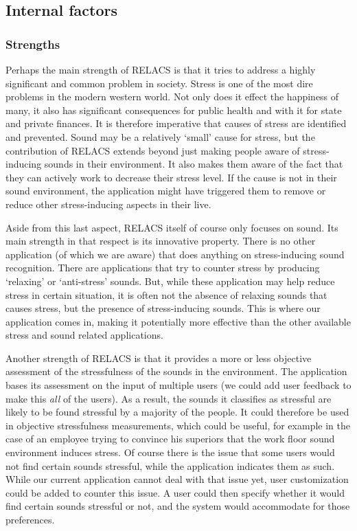 \documentclass[a4paper]{article}
\begin{document}
\subsection{Internal factors}
\subsubsection{Strengths}
Perhaps the main strength of RELACS is that it tries to address a highly significant and common problem in society.
Stress is one of the most dire problems in the modern western world.
Not only does it effect the happiness of many, it also has significant consequences for public health and with it for state and private finances.
It is therefore imperative that causes of stress are identified and prevented.
Sound may be a relatively `small' cause for stress, but the contribution of RELACS extends beyond just making people aware of stress-inducing sounds in their environment.
It also makes them aware of the fact that they can actively work to decrease their stress level.
If the cause is not in their sound environment, the application might have triggered them to remove or reduce other stress-inducing aspects in their live.

Aside from this last aspect, RELACS itself of course only focuses on sound.
Its main strength in that respect is its innovative property.
There is no other application (of which we are aware) that does anything on stress-inducing sound recognition.
There are applications that try to counter stress by producing `relaxing' or `anti-stress' sounds.
But, while these application may help reduce stress in certain situation, it is often not the absence of relaxing sounds that causes stress, but the presence of stress-inducing sounds.
This is where our application comes in, making it potentially more effective than the other available stress and sound related applications.

Another strength of RELACS is that it provides a more or less objective assessment of the stressfulness of the sounds in the environment.
The application bases its assessment on the input of multiple users (we could add user feedback to make this \textit{all} of the users).
As a result, the sounds it classifies as stressful are likely to be found stressful by a majority of the people.
It could therefore be used in objective stressfulness measurements, which could be useful,
for example in the case of an employee trying to convince his superiors that the work floor sound environment induces stress.
Of course there is the issue that some users would not find certain sounds stressful, while the application indicates them as such.
While our current application cannot deal with that issue yet, user customization could be added to counter this issue.
A user could then specify whether it would find certain sounds stressful or not, and the system would accommodate for those preferences.
\end{document}
